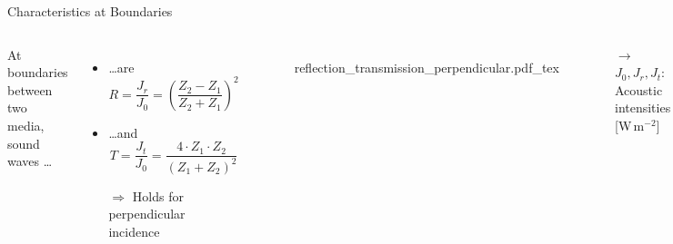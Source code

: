\begin{frame}{Characteristics at Boundaries}

    \begin{columns}[T]

        At boundaries between two media, sound waves \dots
        \begin{itemize}
            \item \dots are \\
                  \hspace{1cm}{ $\rightarrow$ Reflection coefficient}
                  $$R = \frac{J_r}{J_0} = \left(\frac{Z_2-Z_1}{Z_2+Z_1}\right)^2$$
                  \vspace{.1cm}
            \item \dots and \\
                  \hspace{1cm}{ $\rightarrow$ Transmission coefficient}
                  $$T = \frac{J_t}{J_0} = \frac{4\cdot Z_1 \cdot Z_2}{\left(Z_1+Z_2\right)^2}$$
            \item[$\Rightarrow$] Holds for perpendicular incidence
        \end{itemize}
        \vspace{.5cm}

        \vspace{-.5cm}
        \begin{figure}
            \def\svgwidth{.85\columnwidth}
            {reflection_transmission_perpendicular.pdf_tex}
        \end{figure}
        \vspace{-0.4cm}
        { $\rightarrow$ $J_0, J_r, J_t$: Acoustic intensities [W\,m$^{-2}$]}
    \end{columns}

\end{frame}


